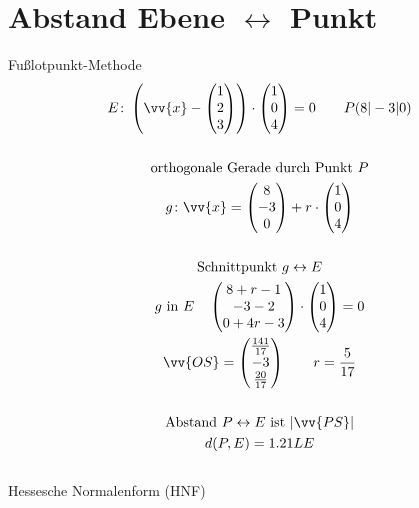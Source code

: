 \section{Abstand Ebene $\leftrightarrow$ Punkt}
Fußlotpunkt-Methode
\begin{gather*}
  E \colon \left(\vv{x} - \begin{pmatrix}1 \\ 2 \\ 3\end{pmatrix}\right) \cdot \begin{pmatrix}1 \\ 0 \\ 4\end{pmatrix} = 0 \qquad P(8|-3|0) \\\\
  \text{orthogonale Gerade durch Punkt $P$} \\
  g \colon \vv{x} = \begin{pmatrix}8 \\ -3 \\ 0\end{pmatrix} + r \cdot \begin{pmatrix}1 \\ 0 \\ 4\end{pmatrix} \\\\
  \text{Schnittpunkt $g \leftrightarrow E$} \\
  \text{$g$ in $E$} \quad \begin{pmatrix}8 + r - 1 \\ -3 - 2 \\ 0 + 4r - 3\end{pmatrix} \cdot \begin{pmatrix}1 \\ 0 \\ 4\end{pmatrix} = 0 \\
  \vv{OS} = \begin{pmatrix}\frac{141}{17} \\ -3 \\ \frac{20}{17}\end{pmatrix} \qquad r = \frac{5}{17} \\\\
  \text{Abstand $P \leftrightarrow E$ ist $|\vv{PS}|$} \\
  d(P, E) = 1.21LE
\end{gather*} \\
Hessesche Normalenform (HNF)

